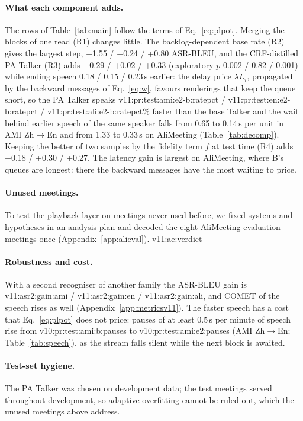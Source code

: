 \paragraph{What each component adds.} The rows of Table~\ref{tab:main} follow the terms of Eq.~\eqref{eq:plpot}.
Merging the blocks of one read (R1) changes little. The backlog-dependent base rate (R2) gives the largest step,
+1.55 / +0.24 / +0.80 ASR-BLEU, and the CRF-distilled PA Talker (R3) adds +0.29 / +0.02 / +0.33 (exploratory $p$ 0.002
/ 0.82 / 0.001) while ending speech 0.18 / 0.15 / 0.23\,s earlier: the delay price $\lambda L_i$, propagated by the
backward messages of Eq.~\eqref{eq:w}, favours renderings that keep the queue short, so the PA Talker speaks
\num{v11:pr:test:ami:e2-b:ratepct} / \num{v11:pr:test:en:e2-b:ratepct} / \num{v11:pr:test:ali:e2-b:ratepct}\% faster
than the base Talker and the wait behind earlier speech of the same speaker falls from 0.65 to 0.14\,s per unit in
AMI Zh$\rightarrow$En and from 1.33 to 0.33\,s on AliMeeting (Table~\ref{tab:decomp}). Keeping the better of two
samples by the fidelity term $f$ at test time (R4) adds +0.18 / +0.30 / +0.27. The latency gain is largest on
AliMeeting, where B's queues are longest: there the backward messages have the most waiting to price.

\ifAliEval
\paragraph{Unused meetings.}
\label{sec:res-alieval}
To test the playback layer on meetings never used before, we fixed systems and hypotheses in an analysis plan and
decoded the eight AliMeeting evaluation meetings once (Appendix~\ref{app:alieval}). \num{v11:ae:verdict}
\fi

\paragraph{Robustness and cost.}\ifMetricsV{} With a second recogniser of another family the ASR-BLEU gain is
\num{v11:asr2:gain:ami} / \num{v11:asr2:gain:en} / \num{v11:asr2:gain:ali}, and COMET of the speech rises as well
(Appendix~\ref{app:metricsv11}).\fi{} The faster speech has a cost that Eq.~\eqref{eq:plpot} does not price: pauses of
at least 0.5\,s per minute of speech rise from \num{v10:pr:test:ami:b:pauses} to \num{v10:pr:test:ami:e2:pauses}
(AMI Zh$\rightarrow$En; Table~\ref{tab:speech}), as the stream falls silent while the next block is awaited.

\paragraph{Test-set hygiene.}
\label{sec:res-hygiene}
The PA Talker was chosen on development data; the test meetings served throughout development, so adaptive
overfitting cannot be ruled out\ifAliEval{}, which the unused meetings above address\fi.
